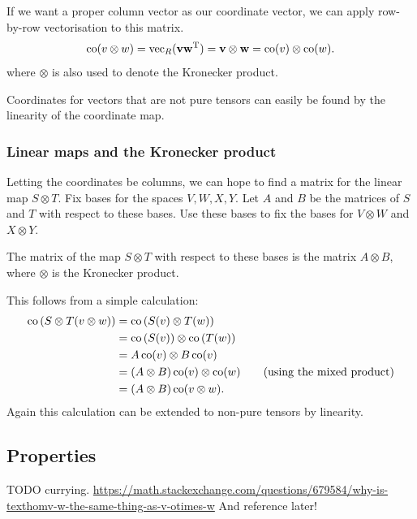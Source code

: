 If we want a proper column vector as our coordinate vector, we can apply row-by-row vectorisation to this matrix.
\[ \operatorname{co}(v\otimes w) = \operatorname{vec}_R(\boldsymbol{\mathrm{v}}\boldsymbol{\mathrm{w}}^{\mathrm{T}}) = \boldsymbol{\mathrm{v}}\otimes\boldsymbol{\mathrm{w}} = \operatorname{co}(v)\otimes\operatorname{co}(w). \]
where $\otimes$ is also used to denote the Kronecker product.

Coordinates for vectors that are not pure tensors can easily be found by the linearity of the coordinate map.
\subsubsection{Linear maps and the Kronecker product}
Letting the coordinates be columns, we can hope to find a matrix for the linear map $S\otimes T$. Fix bases for the spaces $V,W,X,Y$. Let $A$ and $B$ be the matrices of $S$ and $T$ with respect to these bases. Use these bases to fix the bases for $V\otimes W$ and $X\otimes Y$.

\begin{eigenschap}
The matrix of the map $S\otimes T$ with respect to these bases is the matrix $A\otimes B$, where $\otimes$ is the Kronecker product.
\end{eigenschap}

This follows from a simple calculation:
\begin{align*}
\operatorname{co}\left(S\otimes T(v\otimes w)\right) &= \operatorname{co}\left(S(v)\otimes T(w)\right) \\
&= \operatorname{co}\left(S(v)\right)\otimes \operatorname{co}\left(T(w)\right) \\
&= A\operatorname{co}(v)\otimes B\operatorname{co}(v) \\
&= (A\otimes B)\operatorname{co}(v)\otimes\operatorname{co}(w) \qquad (\text{using the mixed product}) \\
&= (A\otimes B)\operatorname{co}(v\otimes w).
\end{align*}
Again this calculation can be extended to non-pure tensors by linearity.

\subsection{Properties}
TODO currying.
\url{https://math.stackexchange.com/questions/679584/why-is-texthomv-w-the-same-thing-as-v-otimes-w}
And reference later!
